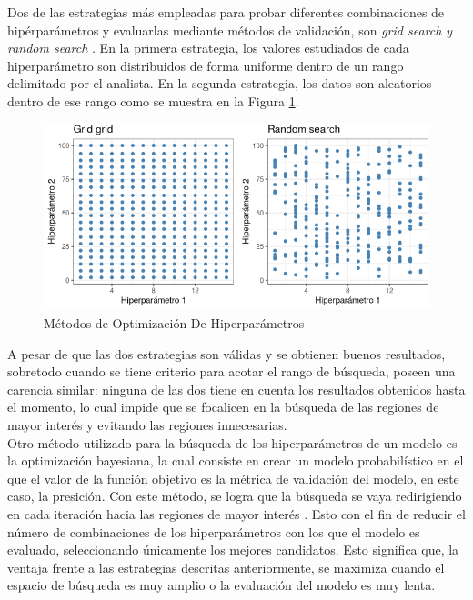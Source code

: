 	Dos de las estrategias más empleadas para probar diferentes combinaciones de hipérparámetros y evaluarlas mediante métodos de validación, son \textit{grid search y random search} \cite{liashchynskyi2019grid}. En la primera estrategia, los valores estudiados de cada hiperparámetro son distribuidos de forma uniforme dentro de un rango delimitado por el analista. En la segunda estrategia, los datos son aleatorios dentro de ese rango como se muestra en la Figura \ref{fig:Hiperparámetros grid search y random search}.
	
	\begin{figure}[ht]
		\centering
		\includegraphics[scale=0.6]{Figs/121.png}
		\caption{Métodos de Optimización De Hiperparámetros}
		\label{fig:Hiperparámetros grid search y random search}
	\end{figure}
	
	A pesar de que las dos estrategias son válidas y se obtienen buenos resultados, sobretodo cuando se tiene criterio para acotar el rango de búsqueda, poseen una carencia similar: ninguna de las dos tiene en cuenta los resultados obtenidos hasta el momento, lo cual impide que se focalicen en la búsqueda de las regiones de mayor interés y evitando las regiones innecesarias.\\
	

	Otro método utilizado para la búsqueda de los hiperparámetros de un modelo es la optimización bayesiana, la cual consiste en crear un modelo probabilístico en el que el valor de la función objetivo es la métrica de validación del modelo, en este caso, la presición. Con este método, se logra que la búsqueda se vaya redirigiendo en cada iteración hacia las regiones de mayor interés \cite{frazier2018tutorial}. Esto con el fin de reducir el número de combinaciones de los hiperparámetros con los que el modelo es evaluado, seleccionando únicamente los mejores candidatos. Esto significa que, la ventaja frente a las estrategias descritas anteriormente, se maximiza cuando el espacio de búsqueda es muy amplio o la evaluación del modelo es muy lenta.\\
	

